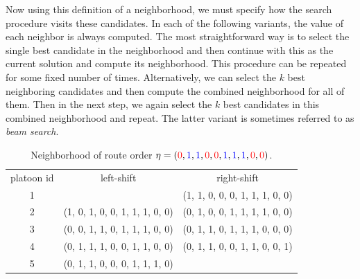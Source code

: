 \documentclass[a4paper]{article}
\theoremstyle{definition}
\theoremstyle{plain}
\newtheorem{proposition}{Proposition}
\begin{document}
Now using this definition of a neighborhood, we must specify how the search
procedure visits these candidates.
In each of the following variants, the value of each neighbor is always computed.
%
The most straightforward way is to select the single best candidate in the
neighborhood and then continue with this as the current solution and compute its
neighborhood. This procedure can be repeated for some fixed number of times.
Alternatively, we can select the $k$ best neighboring candidates and then
compute the combined neighborhood for all of them. Then in the next step, we
again select the $k$ best candidates in this combined neighborhood and repeat.
The latter variant is sometimes referred to as \textit{beam search}.

\newcommand*{\1}{{\color{blue}1}}%
\newcommand*{\0}{{\color{red}0}}%

\begin{table}
\caption{Neighborhood of route order $\eta = (\0, \1, \1, \0, \0, \1, \1, \1, \0, \0)$.}
\label{tab:local_search}
\begin{center}
\begin{tabular}{c|c|c}
  platoon id  & left-shift & right-shift \\
  1 &  & (\1, \1, \0, \0, \0, \1, \1, \1, \0, \0) \\
  2 & (\1, \0, \1, \0, \0, \1, \1, \1, \0, \0) & (\0, \1, \0, \0, \1, \1, \1, \1, \0, \0) \\
  3 & (\0, \0, \1, \1, \0, \1, \1, \1, \0, \0) & (\0, \1, \1, \0, \1, \1, \1, \0, \0, \0) \\
  4 & (\0, \1, \1, \1, \0, \0, \1, \1, \0, \0) & (\0, \1, \1, \0, \0, \1, \1, \0, \0, \1) \\
  5 & (\0, \1, \1, \0, \0, \0, \1, \1, \1, \0) &
\end{tabular}
\end{center}
\end{table}




\end{document}
